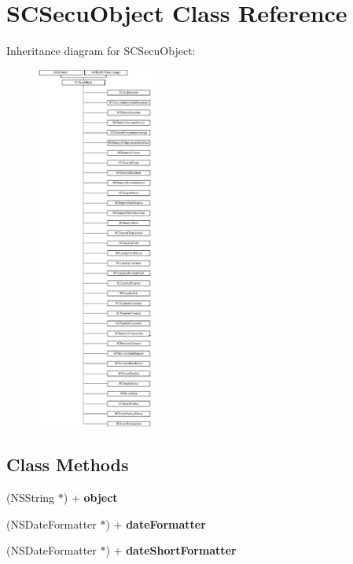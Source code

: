 \hypertarget{interface_s_c_secu_object}{}\section{S\+C\+Secu\+Object Class Reference}
\label{interface_s_c_secu_object}
Inheritance diagram for S\+C\+Secu\+Object\+:\begin{figure}[H]
\begin{center}
\leavevmode
\includegraphics[height=12.000000cm]{interface_s_c_secu_object}
\end{center}
\end{figure}
\subsection*{Class Methods}
\begin{DoxyCompactItemize}
\item 
(N\+S\+String $\ast$) + {\bfseries object}\hypertarget{interface_s_c_secu_object_a10a24dadfb8e924c4f73c4fb35dc2a91}{}\label{interface_s_c_secu_object_a10a24dadfb8e924c4f73c4fb35dc2a91}

\item 
(N\+S\+Date\+Formatter $\ast$) + {\bfseries date\+Formatter}\hypertarget{interface_s_c_secu_object_a4500430c5496f256250415c7ff56f41d}{}\label{interface_s_c_secu_object_a4500430c5496f256250415c7ff56f41d}

\item 
(N\+S\+Date\+Formatter $\ast$) + {\bfseries date\+Short\+Formatter}\hypertarget{interface_s_c_secu_object_a1e3551402230cbba14a599946e691cdd}{}\label{interface_s_c_secu_object_a1e3551402230cbba14a599946e691cdd}

\end{DoxyCompactItemize}
